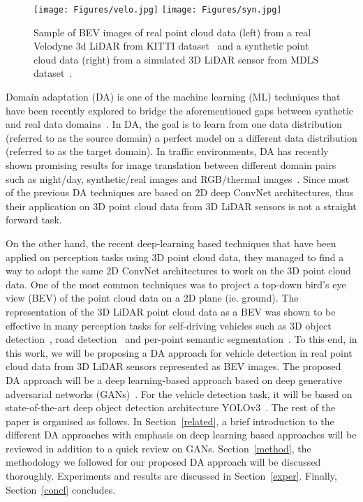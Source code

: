 \documentclass[letterpaper, 10 pt, conference]{IEEEtran}
\begin{document}
 \begin{figure}[t]
 \centering
	\texttt{[image: Figures/velo.jpg]}
	\texttt{[image: Figures/syn.jpg]}
		\caption{Sample of BEV images of real point cloud data (left) from a real Velodyne 3d LiDAR from KITTI dataset~\cite{Geiger2012CVPR} and a synthetic point cloud data (right) from a simulated 3D LiDAR sensor from MDLS dataset~\cite{yoon2018mapless}.} 
	\label{fig:syn_velo}
\end{figure}

\smallbreak
Domain adaptation (DA) is one of the machine learning (ML) techniques that have been recently explored to bridge the aforementioned gaps between synthetic and real data domains~\cite{wang2018deep}. In DA, the goal is to learn from one data distribution (referred to as the source domain) a perfect model on a different data distribution (referred to as the target domain). In traffic environments, DA has recently shown promising results for image translation between different domain pairs such as night/day, synthetic/real images and RGB/thermal images~\cite{zhu2017unpaired}. Since most of the previous DA techniques are based on 2D deep ConvNet architectures, thus their application on 3D point cloud data from 3D LiDAR sensors is not a straight forward task.



\smallbreak
On the other hand, the recent deep-learning based techniques that have been applied on perception tasks using 3D point cloud data, they managed to find a way to adopt the same 2D ConvNet architectures to work on the 3D point cloud data. One of the most common techniques was to project a top-down bird's eye view (BEV) of the point cloud data on a 2D plane (ie. ground). The representation of the 3D LiDAR point cloud data as a BEV was shown to be effective in many perception tasks for self-driving vehicles such as 3D object detection~\cite{li20173d}, road detection~\cite{caltagirone2017fast} and per-point semantic segmentation~\cite{dewan2017deep}. 
\smallbreak
To this end, in this work, we will be proposing a DA approach for vehicle detection in real point cloud data from 3D LiDAR sensors represented as BEV images. The proposed DA approach will be a deep learning-based approach based on deep generative adversarial networks (GANs)~\cite{zhu2017unpaired}. For the vehicle detection task, it will be based on state-of-the-art deep object detection architecture YOLOv3~\cite{yolov3}. The rest of the paper is organised as follows. In Section~\ref{related}, a brief introduction to the different DA approaches with emphasis on deep learning based approaches will be reviewed in addition to a quick review on GANs. Section~\ref{method}, the methodology we followed for our proposed DA approach will be discussed thoroughly. Experiments and results are discussed in Section~\ref{exper}. Finally, Section~\ref{concl} concludes.
\end{document}
